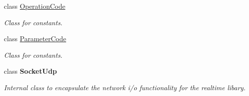 \begin{DoxyCompactItemize}
class \hyperlink{class_exit_games_1_1_client_1_1_photon_1_1_operation_code}{Operation\+Code}
\begin{DoxyCompactList}\small\item\em Class for constants. \end{DoxyCompactList}\item 
class \hyperlink{class_exit_games_1_1_client_1_1_photon_1_1_parameter_code}{Parameter\+Code}
\begin{DoxyCompactList}\small\item\em Class for constants. \end{DoxyCompactList}\item 
class {\bfseries Socket\+Udp}
\begin{DoxyCompactList}\small\item\em Internal class to encapsulate the network i/o functionality for the realtime libary.\end{DoxyCompactList}\end{DoxyCompactItemize}
